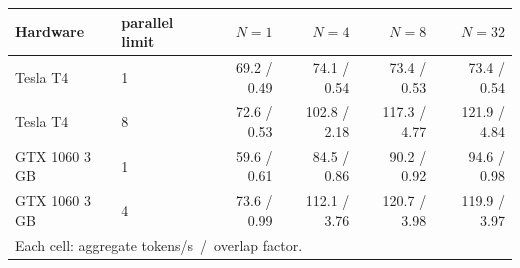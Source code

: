 \begin{tabular}{llrrrr}\toprule
Hardware & parallel limit & $N=1$ & $N=4$ & $N=8$ & $N=32$\\\midrule
Tesla T4 & 1 & 69.2 / 0.49 & 74.1 / 0.54 & 73.4 / 0.53 & 73.4 / 0.54\\
Tesla T4 & 8 & 72.6 / 0.53 & 102.8 / 2.18 & 117.3 / 4.77 & 121.9 / 4.84\\
GTX 1060 3 GB & 1 & 59.6 / 0.61 & 84.5 / 0.86 & 90.2 / 0.92 & 94.6 / 0.98\\
GTX 1060 3 GB & 4 & 73.6 / 0.99 & 112.1 / 3.76 & 120.7 / 3.98 & 119.9 / 3.97\\
\bottomrule
\multicolumn{6}{l}{\scriptsize Each cell: aggregate tokens/s \,/\, overlap factor.}\\
\end{tabular}
